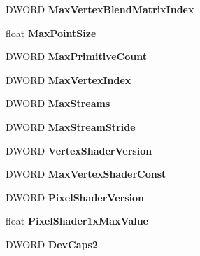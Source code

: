 \begin{DoxyCompactItemize}
\item 
\mbox{\label{struct___d3_d_c_a_p_s9_a237c6233155edafb243dbc183cc64a32}} 
D\+W\+O\+RD {\bfseries Max\+Vertex\+Blend\+Matrix\+Index}
\item 
\mbox{\label{struct___d3_d_c_a_p_s9_aa348eb0d92144ab0fad82e4b9f6ab8f4}} 
float {\bfseries Max\+Point\+Size}
\item 
\mbox{\label{struct___d3_d_c_a_p_s9_aa441658bb183f5d65d9edb2100fbdd6a}} 
D\+W\+O\+RD {\bfseries Max\+Primitive\+Count}
\item 
\mbox{\label{struct___d3_d_c_a_p_s9_a4bac4fef9bb8a375700a0067a42d9689}} 
D\+W\+O\+RD {\bfseries Max\+Vertex\+Index}
\item 
\mbox{\label{struct___d3_d_c_a_p_s9_ac6af003ce0063c67910102572bc25d28}} 
D\+W\+O\+RD {\bfseries Max\+Streams}
\item 
\mbox{\label{struct___d3_d_c_a_p_s9_aede624ee076bcc73edb79522e630c187}} 
D\+W\+O\+RD {\bfseries Max\+Stream\+Stride}
\item 
\mbox{\label{struct___d3_d_c_a_p_s9_a8a4e8ced4c46f48540e40a4acde8c92a}} 
D\+W\+O\+RD {\bfseries Vertex\+Shader\+Version}
\item 
\mbox{\label{struct___d3_d_c_a_p_s9_abf53310664c436665ec5f9e49db9e9f7}} 
D\+W\+O\+RD {\bfseries Max\+Vertex\+Shader\+Const}
\item 
\mbox{\label{struct___d3_d_c_a_p_s9_a522d515201a681ead53ec32f80b569b3}} 
D\+W\+O\+RD {\bfseries Pixel\+Shader\+Version}
\item 
\mbox{\label{struct___d3_d_c_a_p_s9_a79d2693767f2059a758d164631b60e9f}} 
float {\bfseries Pixel\+Shader1x\+Max\+Value}
\item 
\mbox{\label{struct___d3_d_c_a_p_s9_a14bda86636a31c19e0f633ae330bbbab}} 
D\+W\+O\+RD {\bfseries Dev\+Caps2}
\item 

\end{DoxyCompactItemize}
